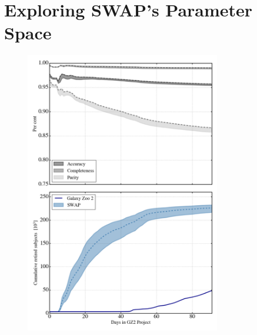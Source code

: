 \documentclass[twocolumn]{aastex6}
\begin{document}
\section{Exploring SWAP's Parameter Space}
\label{sec: tweaking swap}

\begin{figure}[t]
\includegraphics[width=3.35in]{figures/GZX_eval_and_retirement_PLPD_spread_4paper_v2.png}

\end{figure}
\end{document}
